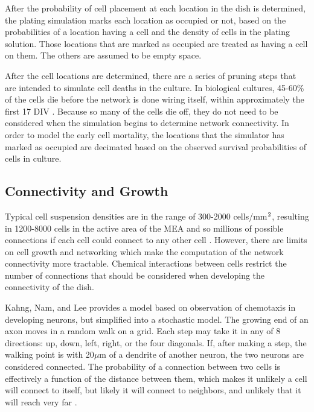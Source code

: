 \documentclass[letterpaper]{article}
\newcommand{\superscript}[1]{\ensuremath{^{\textrm{\scriptsize{#1}}}}}
\begin{document}
After the probability of cell placement at each location in the dish is determined, the plating simulation marks each location as occupied or not, based on the probabilities of a location having a cell and the density of cells in the plating solution. 
Those locations that are marked as occupied are treated as having a cell on them. The others are assumed to be empty space. 

After the cell locations are determined, there are a series of pruning steps that are intended to simulate cell deaths in the culture. 
In biological cultures, 45-60\% of the cells die before the network is done wiring itself, within approximately the first 17 DIV \cite{erickson2008caged}.
Because so many of the cells die off, they do not need to be considered when the simulation begins to determine network connectivity. 
In order to model the early cell mortality, the locations that the simulator has marked as occupied are decimated based on the observed survival probabilities of cells in culture. 

\subsection{Connectivity and Growth}

Typical cell suspension densities are in the range of 300-2000 cells/mm\superscript{2}, resulting in 1200-8000 cells in the active area of the MEA and so millions of possible connections if each cell could connect to any other cell \cite{wagenaar2006extremely}.
However, there are limits on cell growth and networking which make the computation of the network connectivity more tractable. 
Chemical interactions between cells restrict the number of connections that should be considered when developing the connectivity of the dish. 

Kahng, Nam, and Lee  provides a model based on observation of chemotaxis in developing neurons, but simplified into a stochastic model. 
The growing end of an axon moves in a random walk on a grid. 
Each step may take it in any of 8 directions: up, down, left, right, or the four diagonals.
If, after making a step, the walking point is with 20$\mu$m of a dendrite of another neuron, the two neurons are considered connected. 
The probability of a connection between two cells is effectively a function of the distance between them, which makes it unlikely a cell will connect to itself, but likely it will connect to neighbors, and unlikely that it will reach very far \cite{Segev2000185}. 
\end{document}
